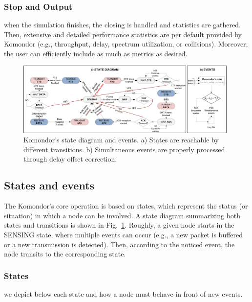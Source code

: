 \documentclass{article}
\begin{document}
	\subsubsection{Stop and Output}
	when the simulation finishes, the closing is handled and statistics are gathered. Then, extensive and detailed performance statistics are per default provided by Komondor (e.g., throughput, delay, spectrum utilization, or collisions). Moreover, the user can efficiently include as much as metrics as desired.
	
	\begin{figure}[t]
		\centering
		\includegraphics[width=0.98\textwidth]{state_diagram.png}
		\caption{Komondor's state diagram and events. a) States are reachable by different transitions. b) Simultaneous events are properly processed through delay offset correction.}
		\label{fig:state_diagram}
	\end{figure}
	
	\subsection{States and events}
	\label{subsection:state_diagram}
	The Komondor's core operation is based on states, which represent the status (or situation) in which a node can be involved. A state diagram summarizing both states and transitions is shown in Fig.~\ref{fig:state_diagram}. Roughly, a given node starts in the SENSING state, where multiple events can occur (e.g., a new packet is buffered or a new transmission is detected). Then, according to the noticed event, the node transits to the corresponding state. 
	
	\subsubsection{States}
	we depict below each state and how a node must behave in front of new events.
	
\end{document}
